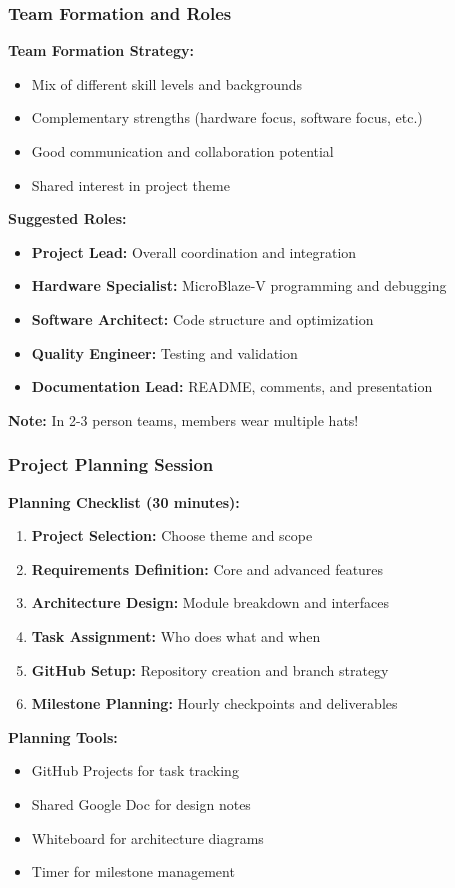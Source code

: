 \documentclass{beamer}
\begin{document}
\begin{frame}
\frametitle{Team Formation and Roles}
\textbf{Team Formation Strategy:}
\begin{itemize}
    \item Mix of different skill levels and backgrounds
    \item Complementary strengths (hardware focus, software focus, etc.)
    \item Good communication and collaboration potential
    \item Shared interest in project theme
\end{itemize}

\vspace{0.5cm}
\textbf{Suggested Roles:}
\begin{itemize}
    \item \textbf{Project Lead:} Overall coordination and integration
    \item \textbf{Hardware Specialist:} MicroBlaze-V programming and debugging
    \item \textbf{Software Architect:} Code structure and optimization
    \item \textbf{Quality Engineer:} Testing and validation
    \item \textbf{Documentation Lead:} README, comments, and presentation
\end{itemize}

\vspace{0.5cm}
\textbf{Note:} In 2-3 person teams, members wear multiple hats!
\end{frame}

\begin{frame}
\frametitle{Project Planning Session}
\textbf{Planning Checklist (30 minutes):}

\begin{enumerate}
    \item \textbf{Project Selection:} Choose theme and scope
    \item \textbf{Requirements Definition:} Core and advanced features
    \item \textbf{Architecture Design:} Module breakdown and interfaces
    \item \textbf{Task Assignment:} Who does what and when
    \item \textbf{GitHub Setup:} Repository creation and branch strategy
    \item \textbf{Milestone Planning:} Hourly checkpoints and deliverables
\end{enumerate}

\vspace{0.5cm}
\textbf{Planning Tools:}
\begin{itemize}
    \item GitHub Projects for task tracking
    \item Shared Google Doc for design notes
    \item Whiteboard for architecture diagrams
    \item Timer for milestone management
\end{itemize}
\end{frame}
\end{document}
